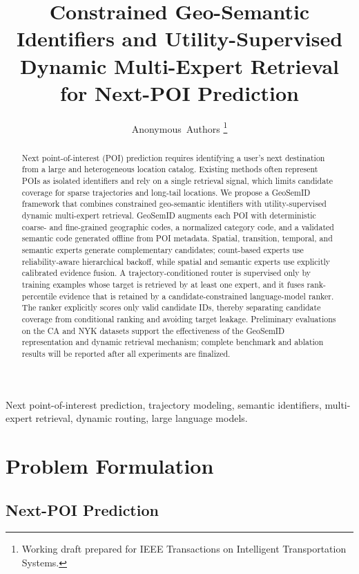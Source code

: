 \documentclass[journal]{IEEEtran}
\title{Constrained Geo-Semantic Identifiers and Utility-Supervised Dynamic Multi-Expert Retrieval for Next-POI Prediction}
\author{Anonymous~Authors%
\thanks{Working draft prepared for IEEE Transactions on Intelligent Transportation Systems.}
}
\begin{document}
\maketitle

\begin{abstract}
Next point-of-interest (POI) prediction requires identifying a user's next
destination from a large and heterogeneous location catalog. Existing methods
often represent POIs as isolated identifiers and rely on a single retrieval
signal, which limits candidate coverage for sparse trajectories and long-tail
locations. We propose a GeoSemID framework that combines constrained
geo-semantic identifiers with utility-supervised dynamic multi-expert
retrieval. GeoSemID augments each POI with deterministic coarse- and
fine-grained geographic codes, a normalized category code, and a validated
semantic code generated offline from POI metadata. Spatial, transition,
temporal, and semantic experts generate complementary candidates; count-based
experts use reliability-aware hierarchical backoff, while spatial and semantic
experts use explicitly calibrated evidence fusion. A trajectory-conditioned
router is supervised only by training examples whose target is retrieved by at
least one expert, and it fuses rank-percentile evidence that is retained by a
candidate-constrained language-model ranker. The ranker explicitly scores only
valid candidate IDs, thereby separating candidate coverage from conditional
ranking and avoiding target leakage. Preliminary evaluations on the CA and NYK
datasets support the effectiveness of the GeoSemID representation and dynamic
retrieval mechanism; complete benchmark and ablation results will be reported
after all experiments are finalized.
\end{abstract}

\begin{IEEEkeywords}
Next point-of-interest prediction, trajectory modeling, semantic identifiers,
multi-expert retrieval, dynamic routing, large language models.
\end{IEEEkeywords}

\section{Problem Formulation}
\label{sec:problem}

\subsection{Next-POI Prediction}
\end{document}
